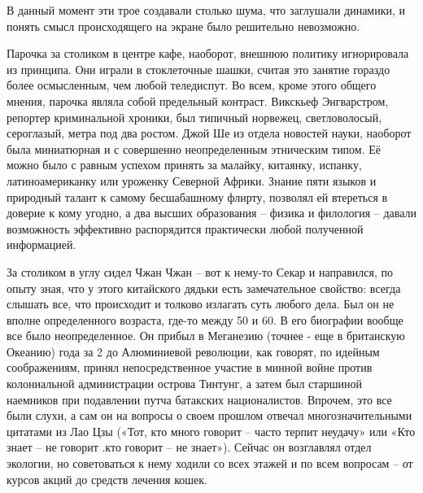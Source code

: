 \documentclass[10pt,final]{book}
\begin{document}
В данный момент эти трое создавали столько шума, что заглушали динамики, и понять смысл происходящего на экране было решительно невозможно.

Парочка за столиком в центре кафе, наоборот, внешнюю политику игнорировала из принципа. Они играли в стоклеточные шашки, считая это занятие гораздо более осмысленным, чем любой теледиспут. Во всем, кроме этого общего мнения, парочка являла собой предельный контраст. Викскьеф Энгварстром, репортер криминальной хроники, был типичный норвежец, светловолосый, сероглазый, метра под два ростом. Джой Ше из отдела новостей науки, наоборот была миниатюрная и с совершенно неопределенным этническим типом. Её можно было с равным успехом принять за малайку, китаянку, испанку, латиноамериканку или уроженку Северной Африки. Знание пяти языков и природный талант к самому бесшабашному флирту, позволял ей втереться в доверие к кому угодно, а два высших образования -- физика и филология -- давали возможность эффективно распорядится практически любой полученной информацией.


За столиком в углу сидел Чжан Чжан -- вот к нему-то Секар и направился, по опыту зная, что у этого китайского дядьки есть замечательное свойство: всегда слышать все, что происходит и толково излагать суть любого дела. Был он не вполне определенного возраста, где-то между 50 и 60. В его биографии вообще все было неопределенное. Он прибыл в Меганезию (точнее - еще в британскую Океанию) года за 2 до Алюминиевой революции, как говорят, по идейным соображениям, принял непосредственное участие в минной войне против колониальной администрации острова Тинтунг, а затем был старшиной наемников при подавлении путча батакских националистов. Впрочем, это все были слухи, а сам он на вопросы о своем прошлом отвечал многозначительными цитатами из Лао Цзы («Тот, кто много говорит -- часто терпит неудачу» или «Кто знает -- не говорит .кто говорит -- не знает»). Сейчас он возглавлял отдел экологии, но советоваться к нему ходили со всех этажей и по всем вопросам -- от курсов акций до средств лечения кошек.
\end{document}
